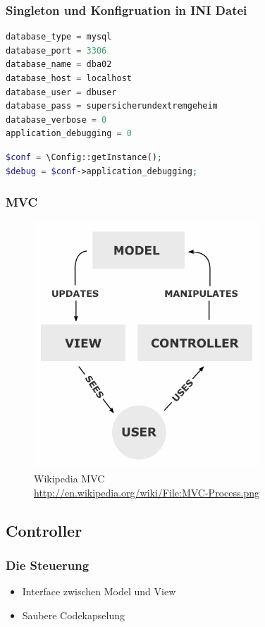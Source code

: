 \documentclass[xcolor=dvipsnames]{beamer}
\begin{document}
\begin{frame}[fragile] %
\frametitle{Singleton und Konfigruation in INI Datei} %

\begin{lstlisting}[language=PHP]
database_type = mysql
database_port = 3306
database_name = dba02
database_host = localhost
database_user = dbuser
database_pass = supersicherundextremgeheim
database_verbose = 0
application_debugging = 0
\end{lstlisting} 

\begin{lstlisting}[language=PHP]
$conf = \Config::getInstance();
$debug = $conf->application_debugging;
\end{lstlisting} 

\end{frame}


\begin{frame} %
\frametitle{MVC} %
\begin{figure}
\includegraphics[scale=0.4]{MVC-Process.png}
\caption{Wikipedia MVC \\ \tiny{\textcolor{gray}{\url{http://en.wikipedia.org/wiki/File:MVC-Process.png}}}}
\end{figure}
\end{frame}


\subsection{Controller}
\begin{frame} %
  \frametitle{Die Steuerung} %
  \begin{block}{}
	  \begin{itemize}
  		\item Interface zwischen Model und View
  		\item Saubere Codekapselung
	  \end{itemize}
  \end{block} 
\end{frame}
\end{document}
